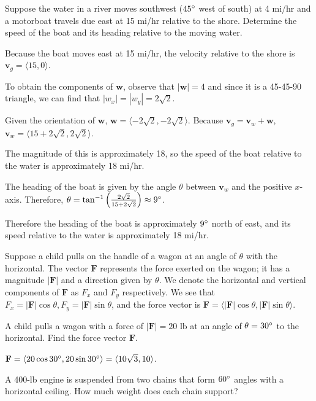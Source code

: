 \documentclass[../calc3.tex]{subfiles}
\begin{document}
\begin{example}
    Suppose the water in a river moves southwest ($45\degree$ west of south) at 4 mi/hr and a motorboat travels due east at 15 mi/hr relative to the shore. Determine the speed of the boat and its heading relative to the moving water.

    Because the boat moves east at 15 mi/hr, the velocity relative to the shore is $\textbf{v}_g = \langle 15,0\rangle$. 

    To obtain the components of $\textbf{w}$, observe that $|\textbf{w}|=4$ and since it is a 45-45-90 triangle, we can find that $|w_x|=|w_y|=2\sqrt{2}$.

    Given the orientation of $\textbf{w}$, $\textbf{w}=\langle -2\sqrt{2},-2\sqrt{2}\rangle$. Because $\textbf{v}_g=\textbf{v}_w+\textbf{w}$, $\textbf{v}_w=\langle 15+2\sqrt{2}, 2\sqrt{2}\rangle$.

    The magnitude of this is approximately 18, so the speed of the boat relative to the water is approximately 18 mi/hr.

    The heading of the boat is given by the angle $\theta$ between $\textbf{v}_w$ and the positive $x$-axis. Therefore, $\theta = \tan^{-1}\left(\frac{2\sqrt{2}}{15+2\sqrt{2}}\right)\approx 9\degree$.

    Therefore the heading of the boat is approximately $9\degree$ north of east, and its speed relative to the water is approximately 18 mi/hr.
\end{example}

Suppose a child pulls on the handle of a wagon at an angle of $\theta$ with the horizontal. The vector $\textbf{F}$ represents the force exerted on the wagon; it has a magnitude 
$|\textbf{F}|$ and a direction given by $\theta$. We denote the horizontal and vertical components of $\textbf{F}$ as $F_x$ and $F_y$ respectively. 
We see that $F_x=|\textbf{F}|\cos\theta, F_y=|\textbf{F}|\sin\theta$, and the force vector is $\textbf{F}=\langle |\textbf{F}|\cos\theta, |\textbf{F}|\sin\theta\rangle$.

\begin{example}
    A child pulls a wagon with a force of $|\textbf{F}| = 20$ lb at an angle of $\theta = 30\degree$ to the horizontal. Find the force vector $\textbf{F}$.

    $\textbf{F}=\langle 20\cos 30\degree, 20\sin 30\degree\rangle = \langle 10\sqrt{3}, 10\rangle$.
\end{example}

\ex A 400-lb engine is suspended from two chains that form $60\degree$ angles with a horizontal ceiling. How much weight does each chain support?
\end{document}
